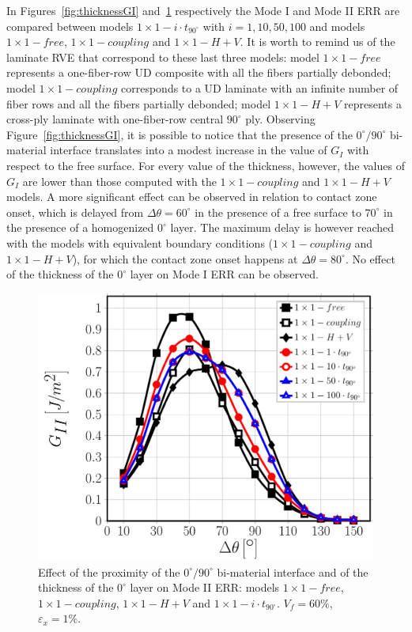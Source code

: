 \documentclass[review]{elsarticle}
\begin{document}
In Figures~\ref{fig:thicknessGI} and~\ref{fig:thicknessGII} respectively the Mode I and Mode II ERR are compared between models $1\times 1-i\cdot t_{90^{\circ}}$ with $i=1,10,50,100$ and models $1\times 1-free$, $1\times 1-coupling$ and $1\times 1-H+V$. It is worth to remind us of the laminate RVE that correspond to these last three models: model $1\times 1-free$ represents a one-fiber-row UD composite with all the fibers partially debonded; model $1\times 1-coupling$ corresponds to a UD laminate with an infinite number of fiber rows and all the fibers partially debonded; model $1\times 1-H+V$ represents a cross-ply laminate with one-fiber-row central $90^{\circ}$ ply. Observing Figure~\ref{fig:thicknessGI}, it is possible to notice that the presence of the $0^{\circ}/90^{\circ}$ bi-material interface translates into a modest increase in the value of $G_{I}$ with respect to the free surface. For every value of the thickness, however, the values of $G_{I}$ are lower than those computed with the $1\times 1-coupling$ and $1\times 1-H+V$ models. A more significant effect can be observed in relation to contact zone onset, which is delayed from $\Delta\theta=60^{\circ}$ in the presence of a free surface to $70^{\circ}$ in the presence of a homogenized $0^{\circ}$ layer. The maximum delay is however reached with the models with equivalent boundary conditions ($1\times 1-coupling$ and $1\times 1-H+V$), for which the contact zone onset happens at $\Delta\theta=80^{\circ}$. No effect of the thickness of the $0^{\circ}$ layer on Mode I ERR can be observed.

\begin{figure}[!h]
\centering
\includegraphics[width=\textwidth]{1x1-i-vf60-GII.pdf}
\caption{Effect of the proximity of the $0^{\circ}/90^{\circ}$ bi-material interface and of the thickness of the $0^{\circ}$ layer on Mode II ERR: models $1\times 1-free$, $1\times 1-coupling$, $1\times 1-H+V$ and $1\times 1-i\cdot t_{90^{\circ}}$. $V_{f}=60\%$, $\varepsilon_{x}=1\%$.}\label{fig:thicknessGII}
\end{figure}
\end{document}

